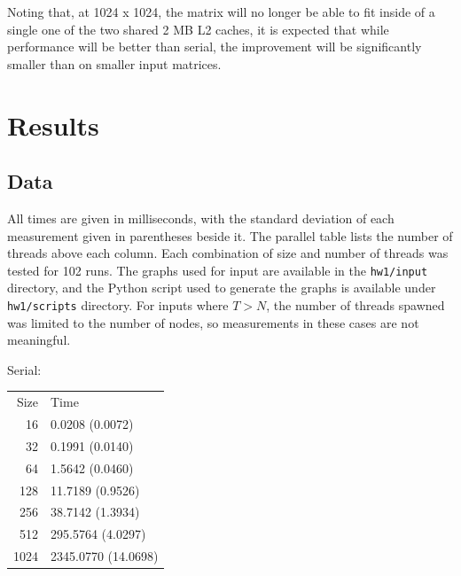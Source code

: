 \documentclass{article}
\begin{document}
\noindent
Noting that, at 1024 x 1024, the matrix will no longer be able to fit
inside of a single one of the two shared 2 MB L2 caches, it is
expected that while performance will be better than serial, the
improvement will be significantly smaller than on smaller input
matrices. 

\section{Results}
\subsection{Data}
All times are given in milliseconds, with the standard deviation of
each measurement given
in parentheses beside it. The parallel table lists the number of threads above
each column. Each combination of size and number of threads was tested
for 102 runs. The graphs used for input are available in the
\texttt{hw1/input} directory, and the Python script used to generate
the graphs is available under \texttt{hw1/scripts} directory. For
inputs where $T > N$, the number of threads spawned was limited to the
number of nodes, so measurements in these cases are not meaningful.



Serial:
\begin{center}
\begin{tabular}{rl}
 Size  &  Time                 \\
   16  &  0.0208 (0.0072)      \\
   32  &  0.1991 (0.0140)      \\
   64  &  1.5642 (0.0460)      \\
  128  &  11.7189 (0.9526)     \\
  256  &  38.7142 (1.3934)     \\
  512  &  295.5764 (4.0297)    \\
 1024  &  2345.0770 (14.0698)  \\
\end{tabular}
\end{center}
\end{document}
